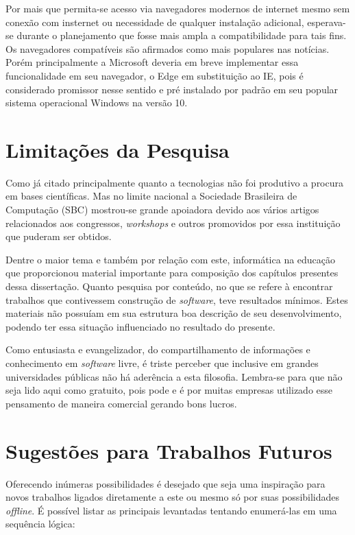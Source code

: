 Por mais que permita-se acesso via navegadores modernos de internet mesmo sem conexão com insternet ou necessidade de qualquer instalação adicional, esperava-se durante o planejamento que fosse mais ampla a compatibilidade para tais fins. Os navegadores compatíveis são afirmados como mais populares nas notícias. Porém principalmente a Microsoft deveria em breve implementar essa funcionalidade em seu navegador, o Edge em substituição ao IE, pois é considerado promissor nesse sentido e pré instalado por padrão em seu popular sistema operacional Windows na versão 10.

\section{Limitações da Pesquisa}

Como já citado principalmente quanto a tecnologias não foi produtivo a procura em bases científicas. Mas no limite nacional a Sociedade Brasileira de Computação (SBC) mostrou-se grande apoiadora devido aos vários artigos relacionados aos congressos, \textit{workshops} e outros promovidos por essa instituição que puderam ser obtidos.

Dentre o maior tema e também por relação com este, informática na educação que proporcionou material importante para composição dos capítulos presentes dessa dissertação. Quanto pesquisa por conteúdo, no que se refere à encontrar trabalhos que contivessem construção de \textit{software}, teve resultados mínimos. Estes materiais não possuíam em sua estrutura boa descrição de seu desenvolvimento, podendo ter essa situação influenciado no resultado do presente.

Como entusiasta e evangelizador, do compartilhamento de informações e conhecimento em \textit{software} livre, é triste perceber que inclusive em grandes universidades públicas não há aderência a esta filosofia. Lembra-se para que não seja lido aqui como gratuito, pois pode e é por muitas empresas utilizado esse pensamento de maneira comercial gerando bons lucros.

\section{Sugestões para Trabalhos Futuros}

Oferecendo inúmeras possibilidades é desejado que seja uma inspiração para novos trabalhos ligados diretamente a este ou mesmo só por suas possibilidades \textit{offline}. É possível listar as principais levantadas tentando enumerá-las em uma sequência lógica:

